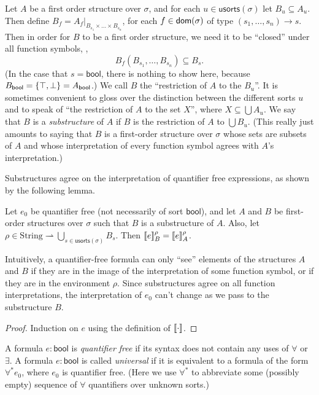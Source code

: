 Let $A$ be a first order structure over $\sigma$,
and for each $u\in\mathsf{usorts}(\sigma)$ let $B_u\subseteq A_u$.
Then define $B_f = A_f|_{B_{s_1}\times\dots\times B_{s_{n}}}$,
for each $f \in \mathsf{dom}(\sigma)$ of type $(s_1, \dots, s_n)\to s$.
Then in order for $B$ to be a first order structure,
we need it to be ``closed'' under all function symbols, \ie,
\[
  B_f(B_{s_1}, \dots, B_{s_n}) \subseteq B_s.
\]
(In the case that $s = \mathsf{bool}$, there is nothing to show here,
because $B_{\mathsf{bool}} = \left\{{\top, \bot}\right\} = A_{\mathsf{bool}}$.)
We call $B$ the ``restriction of $A$ to the $B_u$''.
It is sometimes convenient to gloss over the distinction between the different sorts $u$
and to speak of ``the restriction of $A$ to the set $X$'', where $X \subseteq \bigcup A_u$.
We say that $B$ is a \emph{substructure} of $A$ if $B$ is the restriction of $A$ to $\bigcup B_u$.
(This really just amounts to saying that $B$ is a first-order structure over $\sigma$
whose sets are subsets of $A$
and whose interpretation of every function symbol agrees with $A$'s interpretation.)

Substructures agree on the interpretation of quantifier free expressions,
as shown by the following lemma.
\begin{lemma}\label{lem:qf-denote-substruct}
  Let $e_0$ be quantifier free (not necessarily of sort $\mathsf{bool}$),
  and let $A$ and $B$ be first-order structures over $\sigma$
  such that $B$ is a substructure of $A$.
  Also, let $\rho \in \mathrm{String} \rightharpoonup \bigcup_{s\in\mathsf{usorts}(\sigma)} B_s$.
  Then $\llbracket{e}\rrbracket_B^\rho = \llbracket{e}\rrbracket_A^\rho$.

  Intuitively, a quantifier-free formula can only ``see'' elements
    of the structures $A$ and $B$
    if they are in the image of the interpretation of some function symbol,
    or if they are in the environment $\rho$.
  Since substructures agree on all function interpretations,
    the interpretation of $e_0$ can't change as we pass to the substructure $B$.
\end{lemma}
\begin{proof}
  Induction on $e$ using the definition of $\llbracket{\cdot}\rrbracket$.
\end{proof}

A formula $e : \mathsf{bool}$ is \emph{quantifier free}
  if its syntax does not contain any uses of $\forall$ or $\exists$.
A formula $e : \mathsf{bool}$ is called \emph{universal}
  if it is equivalent to a formula of the form $\forall^* e_0$, where $e_0$ is quantifier free.
(Here we use $\forall^*$ to abbreviate some (possibly empty) sequence of $\forall$ quantifiers over unknown sorts.)

